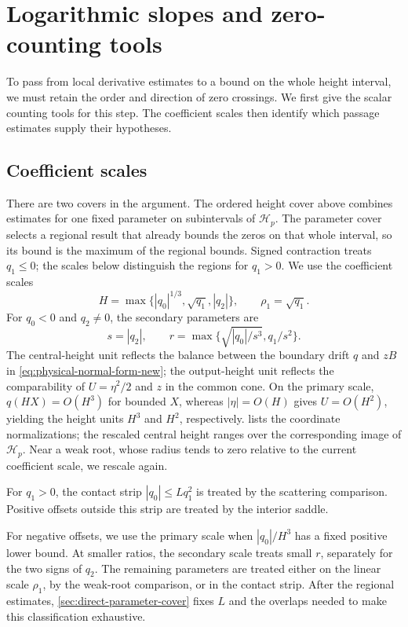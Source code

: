 \section{Logarithmic slopes and zero-counting tools}
\label{sec:standard-tools}

To pass from local derivative estimates to a bound on the whole height
interval, we must retain the order and direction of zero crossings.
We first give the scalar counting tools for this step. The coefficient
scales then identify which passage estimates supply their hypotheses.


\subsection{Coefficient scales}
There are two covers in the argument. The ordered height cover above
combines estimates for one fixed parameter on subintervals of
\(\mathcal H_p\). The parameter cover selects a regional result
that already bounds the zeros on that whole interval, so its bound
is the maximum of the regional bounds. Signed contraction treats
\(q_1\le0\); the scales below distinguish the regions for \(q_1>0\).
We use the coefficient scales
\[
 H=\max\{|q_0|^{1/3},\sqrt{q_1},|q_2|\},\qquad
 \rho_1=\sqrt{q_1}.
\]
For \(q_0<0\) and \(q_2\ne0\), the secondary parameters are
\[
 s=|q_2|,\qquad
 r=\max\{\sqrt{|q_0|/s^3},q_1/s^2\}.
\]
The central-height unit reflects the balance between the boundary drift
\(q\) and \(zB\) in \eqref{eq:physical-normal-form-new}; the output-height
unit reflects the comparability of \(U=\eta^2/2\) and \(z\) in the common
cone. On the primary scale, \(q(HX)=O(H^3)\) for bounded \(X\), whereas
\(|\eta|=O(H)\) gives \(U=O(H^2)\), yielding the height units \(H^3\)
and \(H^2\), respectively.
 lists the coordinate normalizations;
the rescaled central height ranges over the corresponding image of
\(\mathcal H_p\). Near a weak root, whose radius tends to zero relative
to the current coefficient scale, we rescale again.

For \(q_1>0\), the contact strip \(|q_0|\le Lq_1^2\) is treated by
the scattering comparison. Positive offsets outside this strip are
treated by the interior saddle.

For negative offsets, we use the primary scale when \(|q_0|/H^3\)
has a fixed positive lower bound. At smaller ratios, the secondary
scale treats small \(r\), separately for the two signs of \(q_2\).
The remaining parameters are treated either on the linear scale
\(\rho_1\), by the weak-root comparison, or in the contact strip.
After the regional estimates, \cref{sec:direct-parameter-cover} fixes
\(L\) and the overlaps needed to make this classification exhaustive.

